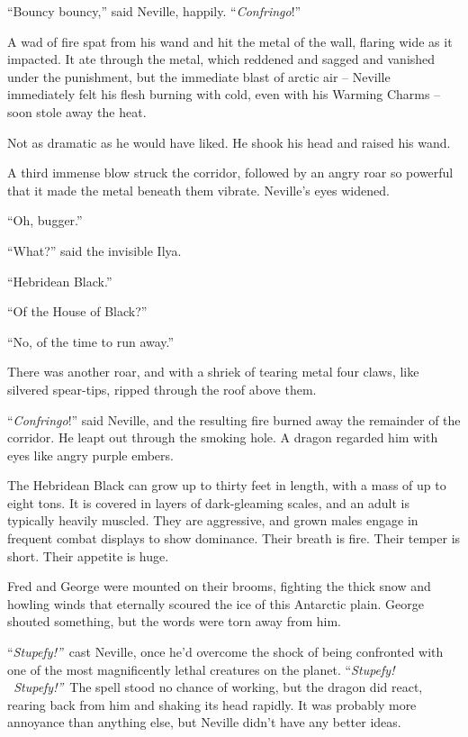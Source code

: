 ``Bouncy bouncy,'' said Neville, happily. ``\emph{Confringo}!''

A wad of fire spat from his wand and hit the metal of the wall, flaring
wide as it impacted. It ate through the metal, which reddened and sagged
and vanished under the punishment, but the immediate blast of arctic air
-- Neville immediately felt his flesh burning with cold, even with his
Warming Charms -- soon stole away the heat.

Not as dramatic as he would have liked. He shook his head and raised his
wand.

A third immense blow struck the corridor, followed by an angry roar so
powerful that it made the metal beneath them vibrate. Neville's eyes
widened.

``Oh, bugger.''

``What?'' said the invisible Ilya.

``Hebridean Black.''

``Of the House of Black?''

``No, of the time to run away.''

There was another roar, and with a shriek of tearing metal four claws,
like silvered spear-tips, ripped through the roof above them.

``\emph{Confringo}!'' said Neville, and the resulting fire burned away
the remainder of the corridor. He leapt out through the smoking hole. A
dragon regarded him with eyes like angry purple embers.

The Hebridean Black can grow up to thirty feet in length, with a mass of
up to eight tons. It is covered in layers of dark-gleaming scales, and
an adult is typically heavily muscled. They are aggressive, and grown
males engage in frequent combat displays to show dominance. Their breath
is fire. Their temper is short. Their appetite is huge.

Fred and George were mounted on their brooms, fighting the thick snow
and howling winds that eternally scoured the ice of this Antarctic
plain. George shouted something, but the words were torn away from him.

``\emph{Stupefy!''}~cast Neville, once he'd overcome the shock of being
confronted with one of the most magnificently lethal creatures on the
planet. ``\emph{Stupefy! ~Stupefy!''}~The spell stood no chance of
working, but the dragon did react, rearing back from him and shaking its
head rapidly. It was probably more annoyance than anything else, but
Neville didn't have any better ideas.


